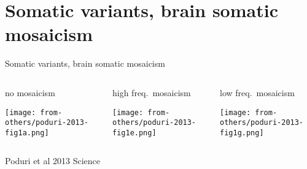 \documentclass[usenames,dvipsnames]{beamer}
\begin{document}
\section{Somatic variants, brain somatic mosaicism}

\begin{frame}{Somatic variants, brain somatic mosaicism}
\begin{columns}[t]
\begin{column}{0.3\textwidth}
\begin{center}
	\footnotesize no mosaicism
\end{center}

\texttt{[image: from-others/poduri-2013-fig1a.png]}
\begin{center}
\end{center}
\end{column}

\begin{column}{0.3\columnwidth}
\begin{center}
	\footnotesize high freq.~mosaicism
\end{center}

\texttt{[image: from-others/poduri-2013-fig1e.png]}
\end{column}
\begin{column}{0.3\columnwidth}
\begin{center}
	\footnotesize low freq.~mosaicism
\end{center}

\texttt{[image: from-others/poduri-2013-fig1g.png]}
\end{column}
\end{columns}
{\tiny Poduri et al 2013 Science}
\end{frame}
\end{document}

